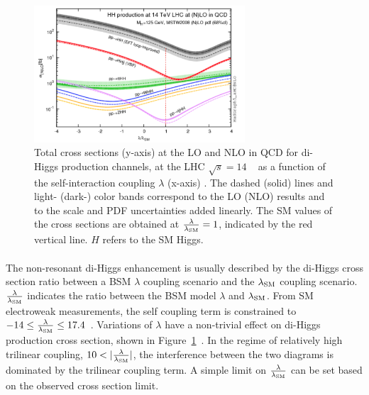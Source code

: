 \begin{figure}[htbp!]
  \centering
  \captionsetup{justification=centering}
  \includegraphics[width=0.7\textwidth]{figures/theory/HH_lam}
  \caption{Total cross sections (y-axis) at the LO and NLO in QCD for di-Higgs production channels, at the LHC $\sqrt{s} = 14$ \TeV~ as a function of the self-interaction coupling $\lambda$ (x-axis) . The dashed (solid) lines and light- (dark-) color bands correspond to the LO (NLO) results and to the scale and PDF uncertainties added linearly. The SM values of the cross sections are obtained at $\frac{\rm \lambda}{\rm \lambda_{\rm SM}} = 1$, indicated by the red vertical line. $H$ refers to the SM Higgs.}
  \label{fig:SM_HH_lam}
\end{figure}

\paragraph{}
The non-resonant di-Higgs enhancement is usually described by the di-Higgs cross section ratio between a BSM $\lambda$ coupling scenario and the $\lambda_{\rm SM}$ coupling scenario.
$\frac{\rm \lambda}{\rm \lambda_{\rm SM}}$ indicates the ratio between the BSM model $\lambda$ and $\lambda_{\rm SM}$.
From SM electroweak measurements, the self coupling term is constrained to $-14 \leq \frac{\rm \lambda}{\rm \lambda_{\rm SM}} \leq 17.4$~\cite{Kribs:2017znd}. 
Variations of $\lambda$ have a non-trivial effect on di-Higgs production cross section, shown in Figure~\ref{fig:SM_HH_lam}~\cite{Frederix:2014hta}. 
In the regime of relatively high trilinear coupling, $10 < |\frac{\rm \lambda}{\rm \lambda_{\rm SM}}|$, the interference between the two diagrams is dominated by the trilinear coupling term. 
A simple limit on $\frac{\rm \lambda}{\rm \lambda_{\rm SM}}$ can be set based on the observed cross section limit.




